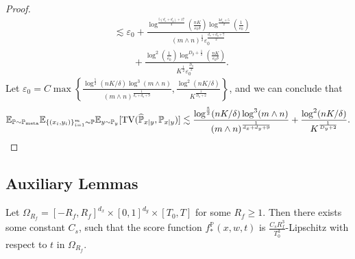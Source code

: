 \documentclass[11pt]{article}
\numberwithin{equation}{section}
\newcommand{\Pmeta}{\mathbb{P}_{\text{meta}}}
\renewcommand{\P}{\mathbb{P}}
\begin{document}
\begin{proof}
\begin{equation}
\begin{aligned}
            &\lesssim \varepsilon_0+\frac{\log^{\frac{5(d_x+d_y)+17}{4}}(\frac{nK}{\varepsilon_0\delta})
            \log^{\frac{3d_x+5}{2}}(\frac{1}{\varepsilon_0})}{(m\wedge n)^{\frac{1}{2}}\varepsilon_0^{\frac{d_x+d_y+7}{2}}} \\
            &\qquad + \frac{\log^2(\frac{1}{\varepsilon_0})\log^{D_y+\frac{1}{2}}(\frac{nK}{\varepsilon_0\delta})}{K^{\frac{1}{2}}\varepsilon_0^{\frac{D_y}{2}}}.
        \end{aligned}
    \end{equation}
    Let $\varepsilon_0=C\max\left\{\frac{\log^{\frac{5}{2}}(nK/\delta)\log^3(m\wedge n)}{(m\wedge n)^{\frac{1}{d_x+d_y+9}}},\frac{\log^2(nK/\delta)}{K^{\frac{1}{D_y+2}}}\right\}$, and we can conclude that
    \begin{equation}
        \E_{\P\sim\Pmeta}\E_{\{(x_i,y_i)\}_{i=1}^m\sim \P}\E_{y\sim\P_y} [\mathrm{TV}(\widehat{\P}_{x|y},\P_{x|y})]
        \lesssim \frac{\log^{\frac{5}{2}}(nK/\delta)\log^3(m\wedge n)}{(m\wedge n)^{\frac{1}{d_x+d_y+9}}}+\frac{\log^2(nK/\delta)}{K^{\frac{1}{D_y+2}}}.
    \end{equation}
\end{proof}


\subsection{Auxiliary Lemmas}

\begin{lemma}\label{lem:lip_t}
    Let $\Omega_{R_f}=[-R_f,R_f]^{d_x}\times[0,1]^{d_y}\times[T_0,T]$ for some $R_f\geq 1$. Then there exists some constant $C_s$, such that the score function $f_*^\P(x,w,t)$ is $\frac{C_sR_f^3}{T_0^3}$-Lipschitz with respect to $t$ in $\Omega_{R_f}$.
\end{lemma}
\end{document}
